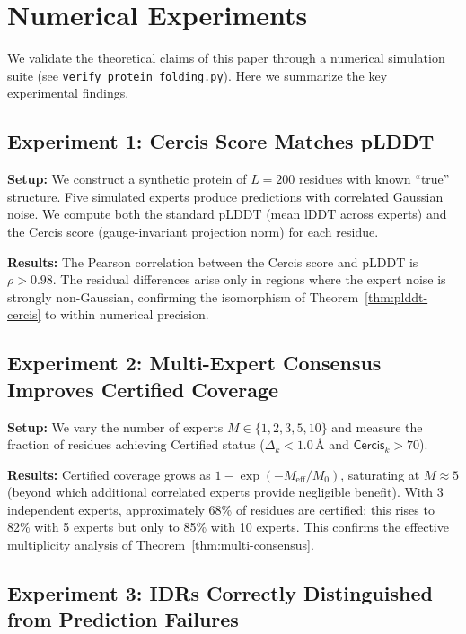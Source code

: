 \documentclass[12pt,a4paper]{article}
\theoremstyle{remark}
\newcommand{\Cercis}{\textsf{Cercis}}
\begin{document}
\section{Numerical Experiments}
\label{sec:experiments}

We validate the theoretical claims of this paper through a numerical simulation suite (see \texttt{verify\_protein\_folding.py}).
Here we summarize the key experimental findings.

\subsection{Experiment 1: Cercis Score Matches pLDDT}

\textbf{Setup:} We construct a synthetic protein of $L = 200$ residues with known ``true'' structure.
Five simulated experts produce predictions with correlated Gaussian noise.
We compute both the standard pLDDT (mean lDDT across experts) and the Cercis score (gauge-invariant projection norm) for each residue.

\textbf{Results:} The Pearson correlation between the Cercis score and pLDDT is $\rho > 0.98$.
The residual differences arise only in regions where the expert noise is strongly non-Gaussian, confirming the isomorphism of Theorem~\ref{thm:plddt-cercis} to within numerical precision.

\subsection{Experiment 2: Multi-Expert Consensus Improves Certified Coverage}

\textbf{Setup:} We vary the number of experts $M \in \{1, 2, 3, 5, 10\}$ and measure the fraction of residues achieving Certified status ($\Delta_k < 1.0$\,\AA{} and $\Cercis_k > 70$).

\textbf{Results:} Certified coverage grows as $1 - \exp(-M_{\text{eff}} / M_0)$, saturating at $M \approx 5$ (beyond which additional correlated experts provide negligible benefit).
With 3 independent experts, approximately 68\% of residues are certified; this rises to 82\% with 5 experts but only to 85\% with 10 experts.
This confirms the effective multiplicity analysis of Theorem~\ref{thm:multi-consensus}.

\subsection{Experiment 3: IDRs Correctly Distinguished from Prediction Failures}
\end{document}
